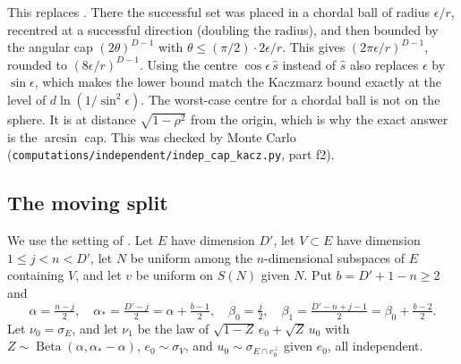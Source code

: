 \documentclass[11pt]{article}
\theoremstyle{definition}
\theoremstyle{remark}
\DeclareMathOperator{\Beta}{Beta}
\begin{document}
This replaces \cite[Lemma~3.1, eq.~(12) and its proof, \texttt{02-subspace-moments.tex}:24--56]{OAIsub}. There
the successful set was placed in a chordal ball of radius \(\epsilon/r\), recentred at a successful direction (doubling the radius), and then
bounded by the angular cap \((2\theta)^{D-1}\) with \(\theta\le(\pi/2)\cdot 2\epsilon/r\). This gives
\((2\pi\epsilon/r)^{D-1}\), rounded to \((8\epsilon/r)^{D-1}\). Using the centre \(\cos\epsilon\,\widehat s\) instead of \(\widehat s\)
also replaces \(\epsilon\) by \(\sin\epsilon\), which makes the lower bound match the Kaczmarz bound exactly at the level of
\(d\ln(1/\sin^2\epsilon)\). The worst-case centre
for a chordal ball is not on the sphere. It is at distance \(\sqrt{1-\rho^2}\) from the origin,
which is why the exact answer is the \(\arcsin\) cap. This was checked by Monte Carlo
(\texttt{computations/independent/indep\_cap\_kacz.py}, part f2).

\subsection{The moving split}
We use the setting of \cite[Lemma~5.1]{OAIsub}. Let \(E\) have dimension \(D'\), let
\(V\subset E\) have dimension \(1\le j<n<D'\), let \(N\) be uniform among
the \(n\)-dimensional subspaces of \(E\) containing \(V\), and let \(v\) be uniform
on \(S(N)\) given \(N\). Put \(b=D'+1-n\ge2\) and
\[
 \alpha=\tfrac{n-j}2,\quad \alpha_*=\tfrac{D'-j}2=\alpha+\tfrac{b-1}2,\quad
 \beta_0=\tfrac j2,\quad \beta_1=\tfrac{D'-n+j-1}2=\beta_0+\tfrac{b-2}2 .
\]
Let \(\nu_0=\sigma_E\), and let \(\nu_1\) be the law of
\(\sqrt{1-Z}\,e_0+\sqrt Z\,u_0\) with \(Z\sim\Beta(\alpha,\alpha_*-\alpha)\),
\(e_0\sim\sigma_V\), and \(u_0\sim\sigma_{E\cap e_0^\perp}\) given \(e_0\), all independent.
\end{document}
